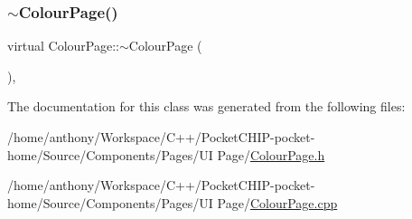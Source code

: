 \mbox{\label{classColourPage_a4eea2a102fcc7268fdf77cb8061cf1dc}} 
\subsubsection{\texorpdfstring{$\sim$\+Colour\+Page()}{~ColourPage()}}
{\footnotesize\ttfamily virtual Colour\+Page\+::$\sim$\+Colour\+Page (\begin{DoxyParamCaption}{ }\end{DoxyParamCaption})\hspace{0.3cm}{\ttfamily [inline]}, {\ttfamily [virtual]}}



The documentation for this class was generated from the following files\+:\begin{DoxyCompactItemize}
\item 
/home/anthony/\+Workspace/\+C++/\+Pocket\+C\+H\+I\+P-\/pocket-\/home/\+Source/\+Components/\+Pages/\+U\+I Page/\mbox{\hyperlink{ColourPage_8h}{Colour\+Page.\+h}}\item 
/home/anthony/\+Workspace/\+C++/\+Pocket\+C\+H\+I\+P-\/pocket-\/home/\+Source/\+Components/\+Pages/\+U\+I Page/\mbox{\hyperlink{ColourPage_8cpp}{Colour\+Page.\+cpp}}\end{DoxyCompactItemize}
